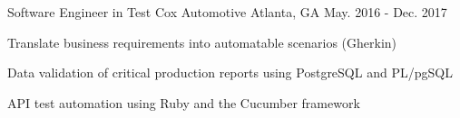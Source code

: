 \begin{cventries}
  \cventry
    {Software Engineer in Test} %
    {Cox Automotive} %
    {Atlanta, GA} %
    {May. 2016 - Dec. 2017} %
    {
      \begin{cvitems} %
        \item {Translate business requirements into automatable scenarios (Gherkin)}
        \item {Data validation of critical production reports using PostgreSQL and PL/pgSQL}
        \item {API test automation using Ruby and the Cucumber framework}
      \end{cvitems}
    }
\end{cventries}
